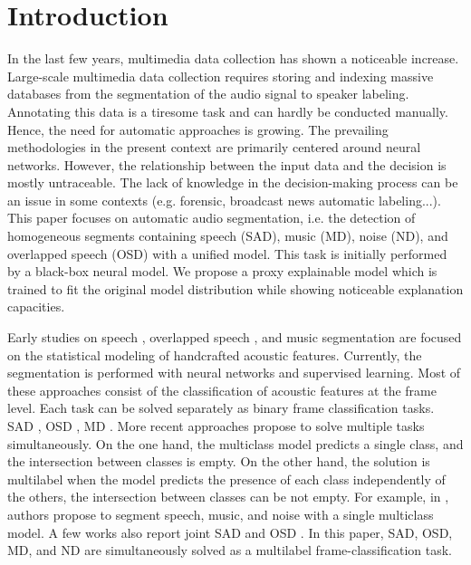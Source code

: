 \section{Introduction}

In the last few years, multimedia data collection has shown a noticeable increase.
Large-scale multimedia data collection requires storing and indexing massive databases from the segmentation of the audio signal to speaker labeling.
Annotating this data is a tiresome task and can hardly be conducted manually.
Hence, the need for automatic approaches is growing.
The prevailing methodologies in the present context are primarily centered around neural networks.
However, the relationship between the input data and the decision is mostly untraceable.
The lack of knowledge in the decision-making process can be an issue in some contexts (e.g. forensic, broadcast news automatic labeling...). 
This paper focuses on automatic audio segmentation, i.e. the detection of homogeneous segments containing speech (SAD), music (MD), noise (ND), and overlapped speech (OSD) with a unified model.
This task is initially performed by a black-box neural model. 
We propose a proxy explainable model which is trained to fit the original model distribution while showing noticeable explanation capacities. 

Early studies on speech \cite{sohn1999statistical}, overlapped speech \cite{charlet_impact_2013}, and music \cite{lavner2009decision} segmentation are focused on the statistical modeling of handcrafted acoustic features.
Currently, the segmentation is performed with neural networks and supervised learning.
Most of these approaches consist of the classification of acoustic features at the frame level.
Each task can be solved separately as binary frame classification tasks.
SAD \cite{lavechin2019end}, OSD \cite{bullock_overlap-aware_2020,lebourdais22_interspeech}, MD \cite{jang2019music,de2019exploring}.
More recent approaches propose to solve multiple tasks simultaneously. 
On the one hand, the multiclass model predicts a single class, and the intersection between classes is empty. 
On the other hand, the solution is multilabel when the model predicts the presence of each class independently of the others, the intersection between classes can be not empty.
For example, in \cite{gimeno2020multiclass}, authors propose to segment speech, music, and noise with a single multiclass model.
A few works also report joint SAD and OSD \cite{jung21_interspeech,bredin21_interspeech,lebourdais2023joint}.
In this paper, SAD, OSD, MD, and ND are simultaneously solved as a multilabel frame-classification task.

